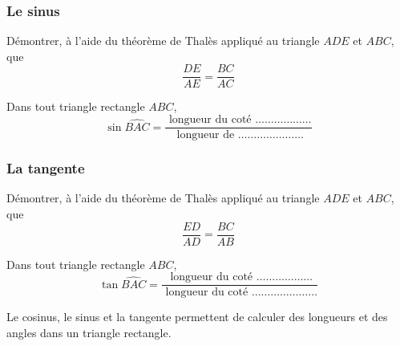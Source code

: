 \begin{minipage}{0.48\linewidth}
\subsubsection{Le sinus}

Démontrer, à l'aide du théorème de Thalès appliqué au triangle $ADE$ et $ABC$, que $$\frac{DE}{AE}=\frac{BC}{AC}$$

\begin{Th}
Dans tout triangle rectangle $ABC$, $$\sin \widehat{BAC} = \frac{ \text{ longueur du coté } \ldots\ldots\ldots\ldots\ldots\ldots}{ \text{ longueur de  } \ldots\ldots\ldots\ldots\ldots\ldots\ldots}$$
\end{Th}


\subsubsection{La tangente}

Démontrer, à l'aide du théorème de Thalès appliqué au triangle $ADE$ et $ABC$, que $$\frac{ED}{AD}=\frac{BC}{AB}$$

\begin{Th}
Dans tout triangle rectangle $ABC$, $$\tan \widehat{BAC} = \frac{ \text{ longueur du coté } \ldots\ldots\ldots\ldots\ldots\ldots}{ \text{ longueur du coté } \ldots\ldots\ldots\ldots\ldots\ldots\ldots}$$
\end{Th}
\end{minipage}

\begin{Rq}
Le  cosinus, le  sinus et la tangente permettent de calculer des longueurs et des angles dans un triangle rectangle.
\end{Rq}